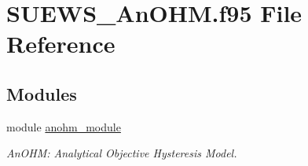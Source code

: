 \hypertarget{_s_u_e_w_s___an_o_h_m_8f95}{}\section{S\+U\+E\+W\+S\+\_\+\+An\+O\+H\+M.\+f95 File Reference}
\label{_s_u_e_w_s___an_o_h_m_8f95}
\subsection*{Modules}
\begin{DoxyCompactItemize}
\item 
module \hyperlink{namespaceanohm__module}{anohm\+\_\+module}
\begin{DoxyCompactList}\small\item\em An\+O\+HM\+: Analytical Objective Hysteresis Model. \end{DoxyCompactList}\end{DoxyCompactItemize}
